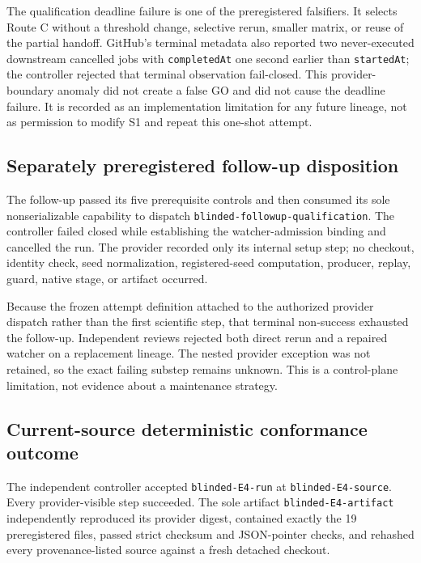 The qualification deadline failure is one of the preregistered falsifiers. It selects Route C without a threshold change, selective rerun, smaller matrix, or reuse of the partial handoff. GitHub's terminal metadata also reported two never-executed downstream cancelled jobs with \texttt{completedAt} one second earlier than \texttt{startedAt}; the controller rejected that terminal observation fail-closed. This provider-boundary anomaly did not create a false GO and did not cause the deadline failure. It is recorded as an implementation limitation for any future lineage, not as permission to modify S1 and repeat this one-shot attempt.

\subsection{Separately preregistered follow-up disposition}\label{separately-preregistered-follow-up-disposition}

The follow-up passed its five prerequisite controls and then consumed its sole
nonserializable capability to dispatch \texttt{blinded-followup-qualification}.
The controller failed closed while establishing the watcher-admission binding
and cancelled the run. The provider recorded only its internal setup step; no
checkout, identity check, seed normalization, registered-seed computation,
producer, replay, guard, native stage, or artifact occurred.

Because the frozen attempt definition attached to the authorized provider
dispatch rather than the first scientific step, that terminal non-success
exhausted the follow-up. Independent reviews rejected both direct rerun and a
repaired watcher on a replacement lineage. The nested provider exception was
not retained, so the exact failing substep remains unknown. This is a
control-plane limitation, not evidence about a maintenance strategy.

\subsection{Current-source deterministic conformance outcome}\label{current-source-deterministic-conformance-outcome}

The independent controller accepted \texttt{blinded-E4-run} at
\texttt{blinded-E4-source}. Every provider-visible step succeeded. The sole
artifact \texttt{blinded-E4-artifact} independently reproduced its provider
digest, contained exactly the 19 preregistered files, passed strict checksum and
JSON-pointer checks, and rehashed every provenance-listed source against a
fresh detached checkout.

